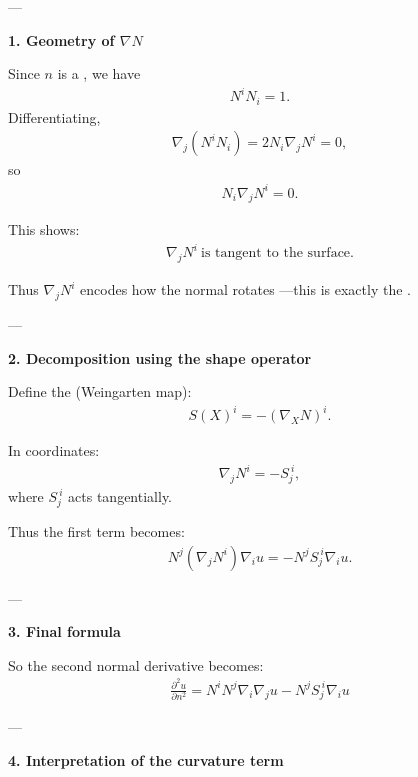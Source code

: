 \documentclass[12pt,a4paper]{report}
\begin{document}
---
\begin{description}
\item \textbf{ 1. Geometry of $\nabla N$}

Since $n$ is a , we have
\begin{align*}
N^i N_i = 1.
\end{align*}
Differentiating,
\begin{align*}
\nabla_j (N^i N_i) = 2 N_i \nabla_j N^i = 0,
\end{align*}
so
\begin{align*}
N_i \nabla_j N^i = 0.
\end{align*}

This shows:
\begin{align*}
\nabla_j N^i \ \text{is tangent to the surface.}
\end{align*}

Thus $\nabla_j N^i$ encodes how the normal rotates —this is exactly the .

---

\item \textbf{ 2. Decomposition using the shape operator}

Define the  (Weingarten map):
\begin{align*}
S(X)^i = -(\nabla_X N)^i.
\end{align*}

In coordinates:
\begin{align*}
\nabla_j N^i = - S_j^{\ i},
\end{align*}
where $S_j^{\ i}$ acts tangentially.

Thus the first term becomes:
\begin{align*}
N^j (\nabla_j N^i)\nabla_i u
= - N^j S_j^{\ i} \nabla_i u.
\end{align*}

---

\item \textbf{ 3. Final formula}

So the second normal derivative becomes:
\begin{align*}
\boxed{
\frac{\partial^2 u}{\partial n^2}
= N^i N^j \nabla_i \nabla_j u - N^j S_j^{\ i} \nabla_i u
}
\end{align*}

---

\item \textbf{ 4. Interpretation of the curvature term}


\end{description}
\end{document}
